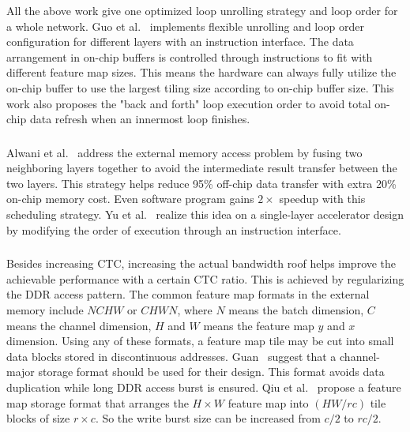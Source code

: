All the above work give one optimized loop unrolling strategy and loop order for a whole network. Guo et al.~\cite{guo2017angel} implements flexible unrolling and loop order configuration for different layers with an instruction interface. The data arrangement in on-chip buffers is controlled through instructions to fit with different feature map sizes. This means the hardware can always fully utilize the on-chip buffer to use the largest tiling size according to on-chip buffer size. This work also proposes the "back and forth" loop execution order to avoid total on-chip data refresh when an innermost loop finishes.

\subsubsection{} Alwani et al.~\cite{alwani2016fused} address the external memory access problem by fusing two neighboring layers together to avoid the intermediate result transfer between the two layers. This strategy helps reduce 95\% off-chip data transfer with extra 20\% on-chip memory cost. Even software program gains $2\times$ speedup with this scheduling strategy. Yu et al.~\cite{Yu2017Instruction} realize this idea on a single-layer accelerator design by modifying the order of execution through an instruction interface.

\subsubsection{} Besides increasing CTC, increasing the actual bandwidth roof helps improve the achievable performance with a certain CTC ratio. This is achieved by regularizing the DDR access pattern. The common feature map formats in the external memory include $NCHW$ or $CHWN$, where $N$ means the batch dimension, $C$ means the channel dimension, $H$ and $W$ means the feature map $y$ and $x$ dimension. Using any of these formats, a feature map tile may be cut into small data blocks stored in discontinuous addresses. Guan~\cite{guan2017fp} suggest that a channel-major storage format should be used for their design. This format avoids data duplication while long DDR access burst is ensured. Qiu et al.~\cite{qiu2016going} propose a feature map storage format that arranges the $H\times W$ feature map into $(HW/rc)$ tile blocks of size $r\times c$. So the write burst size can be increased from $c/2$ to $rc/2$.
